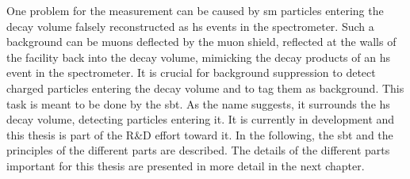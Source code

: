 One problem for the measurement can be caused by \ac{sm} particles entering the decay volume falsely reconstructed as \ac{hs} events in the spectrometer.
Such a background can be muons deflected by the muon shield, reflected at the walls of the facility back into the decay volume, mimicking the decay products of an \ac{hs} event in the spectrometer.
It is crucial for background suppression to detect charged particles entering the decay volume and to tag them as background.
This task is meant to be done by the \ac{sbt}.
As the name suggests, it surrounds the \ac{hs} decay volume, detecting particles entering it.
It is currently in development and this thesis is part of the R\&D effort toward it.
In the following, the \ac{sbt} and the principles of the different parts are described.
The details of the different parts important for this thesis are presented in more detail in the next chapter.

